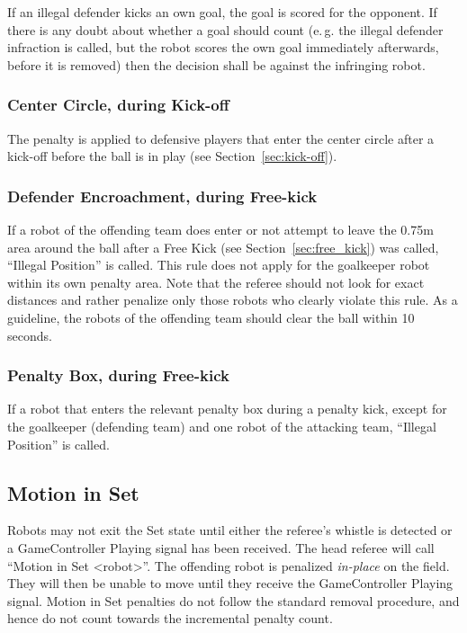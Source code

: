 \documentclass[12pt]{article}
\newcommand{\eg}{\mbox{e.\,g.}\xspace}
\newcommand{\cf}{see\xspace}
\newcommand{\FreeKickRadius}{0.75m\xspace}
\begin{document}
If an illegal defender kicks an own goal, the goal is scored for the opponent. If there is any doubt about whether a goal should count (\eg the illegal defender infraction is called, but the robot scores the own goal immediately afterwards, before it is removed) then the decision shall be against the infringing robot.

\subsubsection{Center Circle, during Kick-off}

The penalty is applied to defensive players that enter the center circle after a kick-off before the ball is in play (\cf Section~\ref{sec:kick-off}).

\subsubsection{Defender Encroachment, during Free-kick}

If a robot of the offending team does enter or not attempt to leave the \FreeKickRadius area around the ball after a Free Kick (\cf Section~\ref{sec:free_kick}) was called, ``Illegal Position'' is called. This rule does not apply for the goalkeeper robot within its own penalty area. Note that the referee should not look for exact distances and rather penalize only those robots who clearly violate this rule. As a guideline, the robots of the offending team should clear the ball within 10 seconds.

\subsubsection{Penalty Box, during Free-kick}

If a robot that enters the relevant penalty box during a penalty kick, except for the goalkeeper (defending team) and one robot of the attacking team, ``Illegal Position'' is called.

\subsection{Motion in Set}
\label{sec:motion_in_set}

Robots may not exit the Set state until either the referee's whistle is detected or a GameController Playing signal has been received. 
The head referee will call ``Motion in Set \textless robot\textgreater''.
The offending robot is penalized \textit{in-place} on the field.  They will then be unable to move until they receive the GameController Playing signal.  Motion in Set penalties do not follow the standard removal procedure, and hence do not count towards the incremental penalty count.
\end{document}
